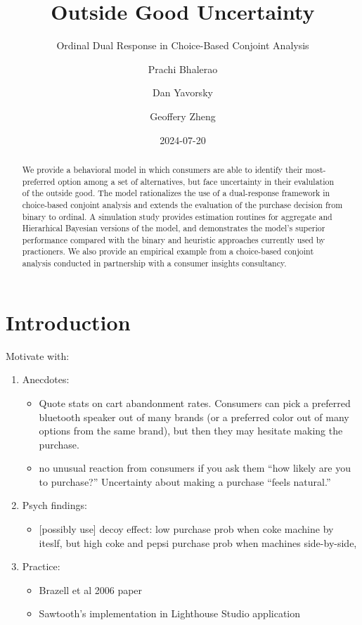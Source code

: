 \documentclass[
  letterpaper,
  DIV=11,
  numbers=noendperiod]{scrartcl}
\title{Outside Good Uncertainty}
\subtitle{Ordinal Dual Response in Choice-Based Conjoint Analysis}
\author{Prachi Bhalerao \and Dan Yavorsky \and Geoffery Zheng}
\date{2024-07-20}
\providecommand{\tightlist}{%
  \setlength{\itemsep}{0pt}\setlength{\parskip}{0pt}}\usepackage{longtable,booktabs,array}
\begin{document}
\maketitle
\begin{abstract}
We provide a behavioral model in which consumers are able to identify
their most-preferred option among a set of alternatives, but face
uncertainty in their evalulation of the outside good. The model
rationalizes the use of a dual-response framework in choice-based
conjoint analysis and extends the evaluation of the purchase decision
from binary to ordinal. A simulation study provides estimation routines
for aggregate and Hierarhical Bayesian versions of the model, and
demonstrates the model's superior performance compared with the binary
and heuristic approaches currently used by practioners. We also provide
an empirical example from a choice-based conjoint analysis conducted in
partnership with a consumer insights consultancy.
\end{abstract}


  \newcommand{\x}{\mathbf{x}}
  \newcommand{\bfbeta}{\boldsymbol{\beta}}
  \newcommand{\iid}{\stackrel{iid}{\sim}}

\section{Introduction}\label{sec-intro}

Motivate with:

\begin{enumerate}
\def\labelenumi{\arabic{enumi}.}
\item
  Anecdotes:

  \begin{itemize}
  \tightlist
  \item
    Quote stats on cart abandonment rates. Consumers can pick a
    preferred bluetooth speaker out of many brands (or a preferred color
    out of many options from the same brand), but then they may hesitate
    making the purchase.
  \item
    no unusual reaction from consumers if you ask them ``how likely are
    you to purchase?'' Uncertainty about making a purchase ``feels
    natural.''
  \end{itemize}
\item
  Psych findings:

  \begin{itemize}
  \tightlist
  \item
    {[}possibly use{]} decoy effect: low purchase prob when coke machine
    by iteslf, but high coke and pepsi purchase prob when machines
    side-by-side,
  \end{itemize}
\item
  Practice:

  \begin{itemize}
  \tightlist
  \item
    Brazell et al 2006 paper
  \item
    Sawtooth's implementation in Lighthouse Studio application
  \end{itemize}
\end{enumerate}
\end{document}
